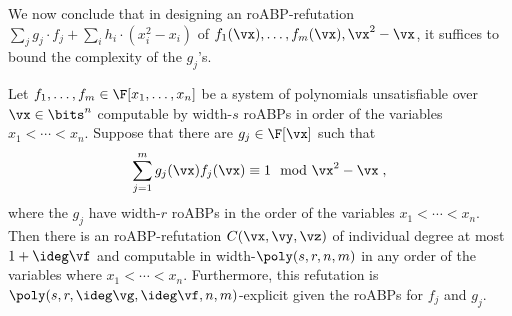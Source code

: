 \documentclass{toc}
\begin{document}
We now conclude that in designing an roABP-\lIPS refutation $\sum_j g_j\cdot f_j+\sum_i h_i\cdot (x_i^2-x_i)$ of $f_1(\vx),\ldots,f_m(\vx),\vx^2-\vx$, it suffices to bound the complexity of the $g_j$'s.

\begin{proposition}\label{res:multilin:roABP-lIPS}
        Let $f_1,\ldots,f_m\in\F[x_1,\ldots,x_n]$ be a system of polynomials unsatisfiable over $\vx\in\bits^n$ computable by width-$s$ roABPs in order of the variables $x_1<\cdots<x_n$.  Suppose that there are $g_j\in\F[\vx]$ such that
        \[
                \sum_{j=1}^m g_j(\vx)f_j(\vx)\equiv 1\mod\vx^2-\vx
                \;,
        \]
        where the $g_j$ have width-$r$ roABPs in the order of the variables $x_1<\cdots<x_n$.  Then there is an roABP-\lIPS refutation $C(\vx,\vy,\vz)$ of individual degree at most $1+\ideg \vf$ and computable in width-$\poly(s,r,n,m)$ in any order of the variables where $x_1<\cdots<x_n$.  Furthermore, this refutation is $\poly(s,r,\ideg \vg,\ideg \vf,n,m)$-explicit given the roABPs for $f_j$ and $g_j$.
\end{proposition}
\end{document}
